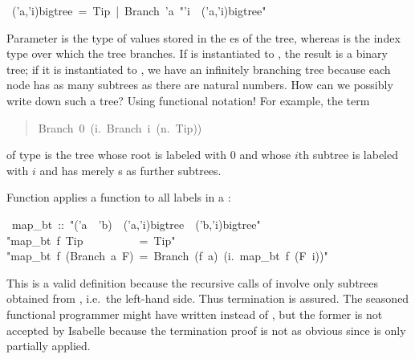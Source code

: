 \begin{isabelle}%
\ ('a,'i)bigtree\ =\ Tip\ |\ Branch\ 'a\ {"}'i\ {\isasymRightarrow}\ ('a,'i)bigtree{"}%
\begin{isamarkuptext}%
\noindent Parameter  is the type of values stored in
the es of the tree, whereas  is the index
type over which the tree branches. If  is instantiated to
, the result is a binary tree; if it is instantiated to
, we have an infinitely branching tree because each node
has as many subtrees as there are natural numbers. How can we possibly
write down such a tree? Using functional notation! For example, the term
\begin{quote}

\begin{isabelle}%
Branch\ 0\ ({\isasymlambda}\mbox{i}.\ Branch\ \mbox{i}\ ({\isasymlambda}\mbox{n}.\ Tip))
\end{isabelle}%

\end{quote}
of type  is the tree whose
root is labeled with 0 and whose $i$th subtree is labeled with $i$ and
has merely s as further subtrees.

Function  applies a function to all labels in a :%
\end{isamarkuptext}%
\ map\_bt\ ::\ {"}('a\ {\isasymRightarrow}\ 'b)\ {\isasymRightarrow}\ ('a,'i)bigtree\ {\isasymRightarrow}\ ('b,'i)bigtree{"}\isanewline
{}\isanewline
{"}map\_bt\ f\ Tip\ \ \ \ \ \ \ \ \ \ =\ Tip{"}\isanewline
{"}map\_bt\ f\ (Branch\ a\ F)\ =\ Branch\ (f\ a)\ ({\isasymlambda}i.\ map\_bt\ f\ (F\ i)){"}%
\begin{isamarkuptext}%
\noindent This is a valid  definition because the
recursive calls of  involve only subtrees obtained from
, i.e.\ the left-hand side. Thus termination is assured.  The
seasoned functional programmer might have written 
instead of , but the former is not accepted by
Isabelle because the termination proof is not as obvious since
 is only partially applied.


\end{isamarkuptext}
\end{isabelle}
